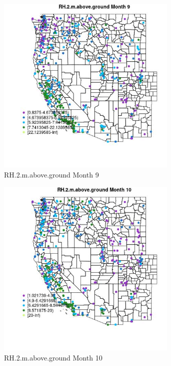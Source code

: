 \begin{figure} 
\centering  
\includegraphics[width=0.77\textwidth]{Code_Outputs/ML_input_report_ML_input_PM25_Step5_part_d_de_duplicated_aves_ML_input_MapObsMo9RH2maboveground.jpg} 
\caption{\label{fig:ML_input_report_ML_input_PM25_Step5_part_d_de_duplicated_aves_ML_inputMapObsMo9RH2maboveground}RH.2.m.above.ground Month 9} 
\end{figure} 
 

\begin{figure} 
\centering  
\includegraphics[width=0.77\textwidth]{Code_Outputs/ML_input_report_ML_input_PM25_Step5_part_d_de_duplicated_aves_ML_input_MapObsMo10RH2maboveground.jpg} 
\caption{\label{fig:ML_input_report_ML_input_PM25_Step5_part_d_de_duplicated_aves_ML_inputMapObsMo10RH2maboveground}RH.2.m.above.ground Month 10} 
\end{figure} 
 

